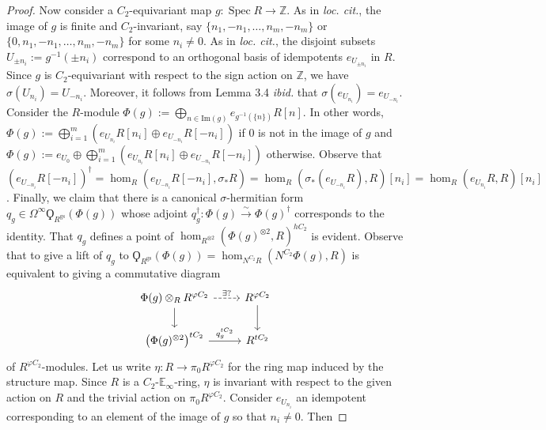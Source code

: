 \documentclass{article}
\DeclareMathOperator{\Spec}{Spec}
\newcommand{\ZZ}{\mathbb{Z}}
\newcommand{\EE}{\mathbb{E}}
\theoremstyle{definition}
\begin{document}
\begin{proof}
    Now consider a $ C_2 $-equivariant map $ g \colon \Spec R \to \ZZ $. 
    As in \emph{loc. cit.}, the image of $ g $ is finite and $ C_2 $-invariant, say $ \{n_1, -n_1, \ldots, n_m, -n_m\} $ or $ \{0, n_1, -n_1, \ldots, n_m, -n_m\} $ for some $ n_i \neq 0 $. 
    As in \emph{loc. cit.}, the disjoint subsets $ U_{\pm n_i} := g^{-1}(\pm n_i) $ correspond to an orthogonal basis of idempotents $ e_{U_{\pm n_i}} $ in $ R $. 
    Since $ g $ is $ C_2 $-equivariant with respect to the sign action on $ \ZZ $, we have $ \sigma(U_{n_i}) = U_{-n_i} $. 
    Moreover, it follows from Lemma 3.4 \emph{ibid.} that $ \sigma(e_{U_{n_i}}) = e_{U_{-n_i}} $. 
    Consider the $ R $-module $ \Phi(g):= \bigoplus_{n \in \mathrm{Im}(g)} e_{g^{-1}(\{n\})} R[n] $. 
    In other words, $ \Phi(g) := \bigoplus_{i=1}^m \left(e_{U_{n_i}}R[n_i] \oplus e_{U_{-n_i}}R[-n_i] \right) $ if $ 0 $ is not in the image of $ g $ and $ \Phi(g) := e_{U_0} \oplus \bigoplus_{i=1}^m \left(e_{U_{n_i}}R[n_i] \oplus e_{U_{-n_i}}R[-n_i] \right) $ otherwise. 
    Observe that $ \left(e_{U_{-n_i}}R[-n_i]\right)^\dag = \hom_R(e_{U_{-n_i}}R[-n_i], \sigma_* R)= \hom_R\left(\sigma_*(e_{U_{-n_i}}R), R\right)[n_i] = \hom_R\left(e_{U_{n_i}}R, R\right)[n_i] $. 
    Finally, we claim that there is a canonical $ \sigma $-hermitian form $ q_g \in \Omega^\infty \Qoppa_{R^{\mathrm{gs}}}(\Phi(g)) $ whose adjoint $ q_g^\dag \colon \Phi(g) \xrightarrow{\sim} \Phi(g)^\dag $ corresponds to the identity. 
    That $ q_g $ defines a point of $ \hom_{R^{\otimes 2}}(\Phi(g)^{\otimes 2}, R)^{hC_2} $ is evident. 
    Observe that to give a lift of $ q_g $ to $ \Qoppa_{R^{\mathrm{gs}}}(\Phi(g)) = \hom_{N^{C_2}R}\left(N^{C_2}\Phi(g), R\right) $ is equivalent to giving a commutative diagram
    \begin{equation}\label{diagram:lifting_sym_form_to_gen_sym_form}
    \begin{tikzcd}
        \Phi(g) \otimes_R R^{\varphi C_2} \ar[d] \ar[r,dashed,"{\exists ?}"] & R^{\varphi C_2} \ar[d] \\
        \left(\Phi(g)^{\otimes 2}\right)^{tC_2} \ar[r,"{q_g^{tC_2}}"] & R^{tC_2}
    \end{tikzcd} 
    \end{equation} 
    of $ R^{\varphi C_2} $-modules. 
    Let us write $ \eta \colon R \to \pi_0 R^{\varphi C_2} $ for the ring map induced by the structure map. 
    Since $ R $ is a $ C_2 $-$ \EE_\infty $-ring, $ \eta $ is invariant with respect to the given action on $ R $ and the trivial action on $ \pi_0 R^{\varphi C_2} $. 
    Consider $ e_{U_{n_i}} $ an idempotent corresponding to an element of the image of $ g $ so that $ n_i \neq 0 $. Then

\end{proof}
\end{document}

